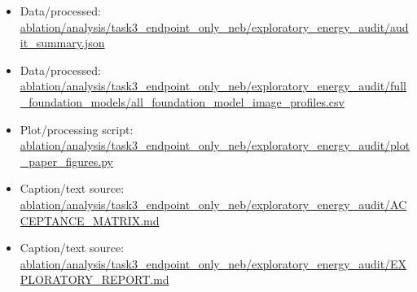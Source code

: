 \begin{itemize}[leftmargin=1.4em,noitemsep]
\item Data/processed: \begingroup\scriptsize\url{ablation/analysis/task3_endpoint_only_neb/exploratory_energy_audit/audit_summary.json}\endgroup
\item Data/processed: \begingroup\scriptsize\url{ablation/analysis/task3_endpoint_only_neb/exploratory_energy_audit/full_foundation_models/all_foundation_model_image_profiles.csv}\endgroup
\item Plot/processing script: \begingroup\scriptsize\url{ablation/analysis/task3_endpoint_only_neb/exploratory_energy_audit/plot_paper_figures.py}\endgroup
\item Caption/text source: \begingroup\scriptsize\url{ablation/analysis/task3_endpoint_only_neb/exploratory_energy_audit/ACCEPTANCE_MATRIX.md}\endgroup
\item Caption/text source: \begingroup\scriptsize\url{ablation/analysis/task3_endpoint_only_neb/exploratory_energy_audit/EXPLORATORY_REPORT.md}\endgroup
\end{itemize}
